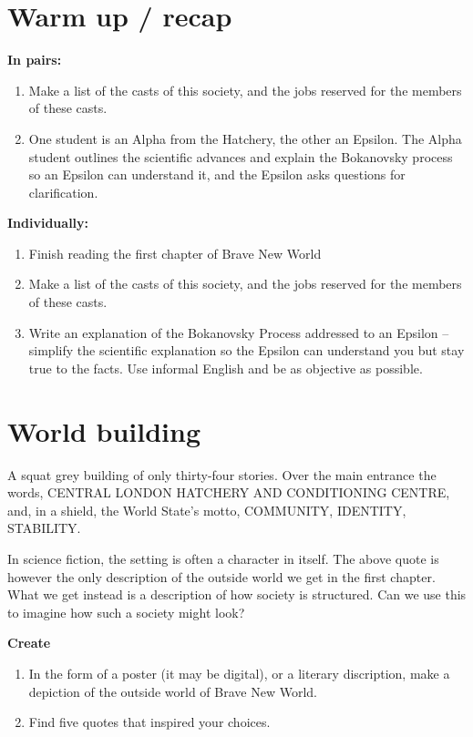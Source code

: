 \documentclass[11pt,a4paper,oneside]{book}
\newcommand{\tasktitle}[1]{{\color{blue}\bfseries #1}\par\smallskip}
\begin{document}
\section*{Warm up / recap}
\begin{taskbox}
\tasktitle{In pairs:}
\begin{enumerate}
\item Make a list of the casts of this society, and the jobs reserved for the members of these casts.
\item One student is an Alpha from the Hatchery, the other an Epsilon. The Alpha student outlines the scientific advances and explain the Bokanovsky process so an Epsilon can understand it, and the Epsilon asks questions for clarification.
\end{enumerate}
\end{taskbox}
\begin{taskbox}
\tasktitle{Individually:}
\begin{enumerate}
\item Finish reading the first chapter of Brave New World
\item Make a list of the casts of this society, and the jobs reserved for the members of these casts.
\item Write an explanation of the Bokanovsky Process addressed to an Epsilon – simplify the scientific explanation so the Epsilon can understand you but stay true to the facts. Use informal English and be as objective as possible.
\end{enumerate}
\end{taskbox}

\section*{World building}
\begin{quotebox}
A squat grey building of only thirty-four stories. Over the main entrance the words, CENTRAL LONDON HATCHERY AND CONDITIONING CENTRE, and, in a shield, the World State’s motto, COMMUNITY, IDENTITY, STABILITY.

\end{quotebox}
In science fiction, the setting is often a character in itself. The above quote is however the only description of the outside world we get in the first chapter. What we get instead is a description of how society is structured. Can we use this to imagine how such a society might look?

\begin{taskbox}
\tasktitle{Create}
\begin{enumerate}
\item In the form of a poster (it may be digital), or a literary discription, make a depiction of the outside world of Brave New World.
\item Find five quotes that inspired your choices.
\end{enumerate}
\end{taskbox}
\end{document}
